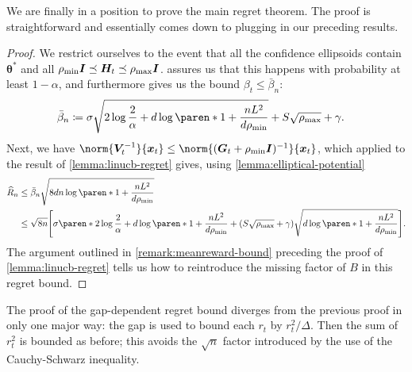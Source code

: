 \documentclass{article}
\renewcommand{\vec}[1]{\bm{#1}}
\newcommand{\defeq}{\coloneq}
\newcommand{\inv}[1]{#1^{-1}}
\DeclarePairedDelimiter{\paren}()
\DeclarePairedDelimiter{\brck}{[}{]}
\newcommand{\Eye}[1][]{\bm{I}\notblank{#1}{_{{#1}\times{#1}}}{}}
\begin{document}
We are finally in a position to prove the main regret theorem.  The
proof is straightforward and essentially comes down to plugging in our
preceding results.

\ThmLinUCBRegret*

\begin{proof}
  We restrict ourselves to the event that all the confidence
  ellipsoids contain $\vec\theta^*$ and all
  $\rho_{\min}\Eye \preceq \vec H_t \preceq \rho_{\max}\Eye$.
   assures us that this happens with probability at least
  $1-\alpha$, and furthermore gives us the bound $\beta_t \le \bar\beta_n$:
  \begin{align*}
    \bar\beta_n &\defeq \sigma\sqrt{2\log\frac{2}{\alpha} + d\log\paren*{1 + \frac{nL^2}{d\rho_{\min}}}}
                 + S\sqrt{\rho_{\max}} + \gamma.
  \end{align*}
  Next, we have
  $\norm{\inv{\vec V_t}}{\vec x_t} \le
  \norm{\inv{(\vec G_t+\rho_{\min}\Eye)}}{\vec x_t}$, which applied to the
  result of \cref{lemma:linucb-regret} gives, using
  \cref{lemma:elliptical-potential}
  \begin{align*}
    \widehat{R}_n
    &\le \bar\beta_n\sqrt{8dn\log\paren*{1+\frac{nL^2}{d\rho_{\min}}}} \\
    &\le \sqrt{8n}\brck*{\sigma\paren*{2\log\frac{2}{\alpha}
      + d\log\paren*{1 + \frac{nL^2}{d\rho_{\min}}}}
      + (S\sqrt{\rho_{\max}}+\gamma)\sqrt{d\log\paren*{1+\frac{nL^2}{d\rho_{\min}}}}}.
  \end{align*}
  The argument outlined in \cref{remark:meanreward-bound} preceding
  the proof of \cref{lemma:linucb-regret} tells us how to reintroduce
  the missing factor of $B$ in this regret bound.
\end{proof}

The proof of the gap-dependent regret bound diverges from the previous
proof in only one major way: the gap is used to bound each $r_t$ by
$r_t^2/\Delta$.  Then the sum of $r_t^2$ is bounded as before; this
avoids the $\sqrt n$ factor introduced by the use of the
Cauchy-Schwarz inequality.

\ThmLinUCBGapRegret*
\end{document}
